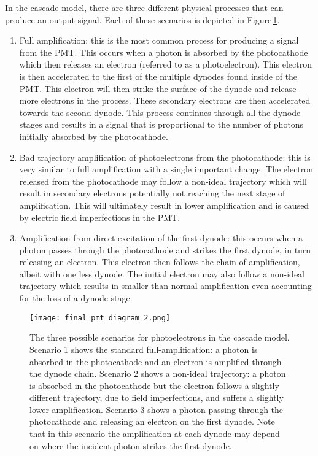 \documentclass[11pt,a4paper]{article}
\newcommand\figref[1]{Figure\,\ref{#1}}
\begin{document}
In the cascade model, there are three different physical processes that can produce an output signal.  Each of these scenarios is depicted in \figref{fig:fig-pmt_diagram}.
\begin{enumerate}
	\item Full amplification: this is the most common process for producing a signal from the PMT.  This occurs when a photon is absorbed by the photocathode which then releases an electron (referred to as a photoelectron).  This electron is then accelerated to the first of the multiple dynodes found inside of the PMT.  This electron will then strike the surface of the dynode and release more electrons in the process.  These secondary electrons are then accelerated towards the second dynode.  This process continues through all the dynode stages and results in a signal that is proportional to the number of photons initially absorbed by the photocathode.
    \item Bad trajectory amplification of photoelectrons from the photocathode: this is very similar to full amplification with a single important change.  The electron released from the photocathode may follow a non-ideal trajectory which will result in secondary electrons potentially not reaching the next stage of amplification.  This will ultimately result in lower amplification and is caused by electric field imperfections in the PMT.  
    \item Amplification from direct excitation of the first dynode: this occurs when a photon passes through the photocathode and strikes the first dynode, in turn releasing an electron.  This electron then follows the chain of amplification, albeit with one less dynode.  The initial electron may also follow a non-ideal trajectory which results in smaller than normal amplification even accounting for the loss of a dynode stage.
\end{enumerate}

\begin{figure}[h]
\centering
\texttt{[image: final\_pmt\_diagram\_2.png]}
\caption{The three possible scenarios for photoelectrons in the cascade model.  Scenario 1 shows the standard full-amplification: a photon is absorbed in the photocathode and an electron is amplified through the dynode chain.  Scenario 2 shows a non-ideal trajectory: a photon is absorbed in the photocathode but the electron follows a slightly different trajectory, due to field imperfections, and suffers a slightly lower amplification.  Scenario 3 shows a photon passing through the photocathode and releasing an electron on the first dynode.  Note that in this scenario  the amplification at each dynode may depend on where the incident photon strikes the first dynode.}
\label{fig:fig-pmt_diagram}
\end{figure}
\end{document}
